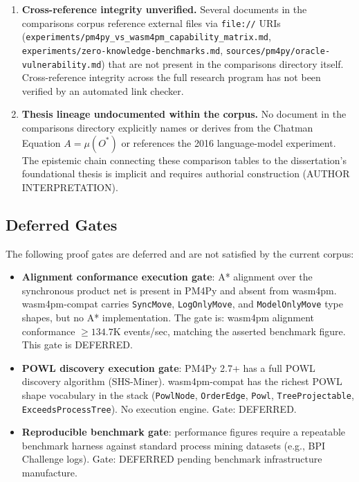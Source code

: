 \begin{enumerate}
  \item \textbf{Cross-reference integrity unverified.} Several documents in
    the comparisons corpus reference external files via \texttt{file://} URIs
    (\texttt{experiments/pm4py\_vs\_wasm4pm\_capability\_matrix.md},
    \texttt{experiments/zero-knowledge-benchmarks.md},
    \texttt{sources/pm4py/oracle-vulnerability.md}) that are not present in
    the comparisons directory itself. Cross-reference integrity across the
    full research program has not been verified by an automated link checker.

  \item \textbf{Thesis lineage undocumented within the corpus.} No document
    in the comparisons directory explicitly names or derives from the Chatman
    Equation $A = \mu(O^*)$ or references the 2016 language-model experiment.
    The epistemic chain connecting these comparison tables to the dissertation's
    foundational thesis is implicit and requires authorial construction
    (AUTHOR INTERPRETATION).
\end{enumerate}

\subsection{Deferred Gates}
\label{sec:comparisons-open-deferred}

The following proof gates are deferred and are not satisfied by the current
corpus:

\begin{itemize}
  \item \textbf{Alignment conformance execution gate}: A* alignment over the
    synchronous product net is present in PM4Py and absent from wasm4pm.
    wasm4pm-compat carries \texttt{SyncMove}, \texttt{LogOnlyMove}, and
    \texttt{ModelOnlyMove} type shapes, but no A* implementation. The gate
    is: wasm4pm alignment conformance $\geq 134.7$K events/sec, matching
    the asserted benchmark figure. This gate is DEFERRED.
  \item \textbf{POWL discovery execution gate}: PM4Py 2.7+ has a full POWL
    discovery algorithm (SHS-Miner). wasm4pm-compat has the richest POWL
    shape vocabulary in the stack (\texttt{PowlNode}, \texttt{OrderEdge},
    \texttt{Powl}, \texttt{TreeProjectable}, \texttt{ExceedsProcessTree}).
    No execution engine. Gate: DEFERRED.
  \item \textbf{Reproducible benchmark gate}: performance figures require
    a repeatable benchmark harness against standard process mining datasets
    (e.g., BPI Challenge logs). Gate: DEFERRED pending benchmark
    infrastructure manufacture.
\end{itemize}

